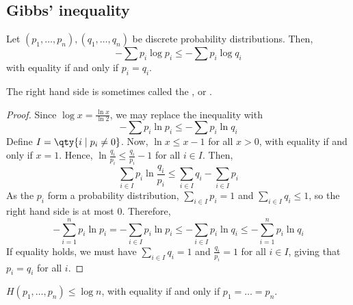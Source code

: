 \subsection{Gibbs' inequality}
\begin{proposition}
    Let $(p_1, \dots, p_n), (q_1, \dots, q_n)$ be discrete probability distributions.
    Then,
    \[ -\sum p_i \log p_i \leq -\sum p_i \log q_i \]
    with equality if and only if $p_i = q_i$.
\end{proposition}
The right hand side is sometimes called the , or .
\begin{proof}
    Since $\log x = \frac{\ln x}{\ln 2}$, we may replace the inequality with
    \[ -\sum p_i \ln p_i \leq -\sum p_i \ln q_i \]
    Define $I = \qty{i \mid p_i \neq 0}$.
    Now, $\ln x \leq x - 1$ for all $x > 0$, with equality if and only if $x = 1$.
    Hence, $\ln \frac{q_i}{p_i} \leq \frac{q_i}{p_i} - 1$ for all $i \in I$.
    Then,
    \[ \sum_{i \in I} p_i \ln \frac{q_i}{p_i} \leq \sum_{i \in I} q_i - \sum_{i \in I} p_i \]
    As the $p_i$ form a probability distribution, $\sum_{i \in I} p_i = 1$ and $\sum_{i \in I} q_i \leq 1$, so the right hand side is at most 0.
    Therefore,
    \[ -\sum_{i=1}^n p_i \ln p_i = -\sum_{i \in I} p_i \ln p_i \leq -\sum_{i \in I} p_i \ln q_i \leq -\sum_{i=1}^n p_i \ln q_i \]
    If equality holds, we must have $\sum_{i \in I} q_i = 1$ and $\frac{q_i}{p_i} = 1$ for all $i \in I$, giving that $p_i = q_i$ for all $i$.
\end{proof}
\begin{corollary}
    $H(p_1, \dots, p_n) \leq \log n$, with equality if and only if $p_1 = \dots = p_n$.
\end{corollary}

